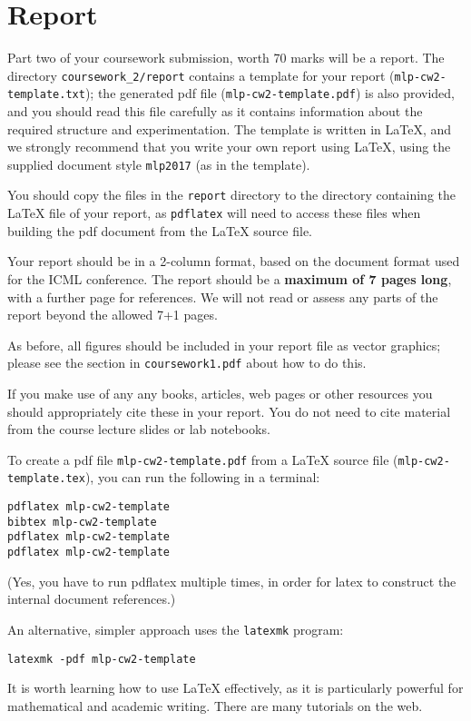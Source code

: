 \documentclass[11pt,]{article}
\begin{document}
\section{Report}
\label{sec:report}
Part two of your coursework submission, worth 70 marks will be a report. The directory
\verb+coursework_2/report+ contains a template for your report (\verb+mlp-cw2-template.txt+);  the generated pdf file (\verb+mlp-cw2-template.pdf+) is also provided, and you should read this file carefully as it contains information about the required structure and experimentation. The template is written in LaTeX, and we strongly recommend that you write your own report using LaTeX, using the supplied document style \verb+mlp2017+ (as in the template).

You should copy the files in the \verb+report+ directory to the directory containing the LaTeX file of your report, as \verb+pdflatex+ will need to access these files when building the pdf document from the LaTeX source file.

Your report should be in a 2-column format, based on the document format used for the ICML conference. The report should be a \textbf{maximum of 7 pages long}, with a further page for references.  We will not read or assess any parts of the report beyond the allowed 7+1 pages.  

As before, all figures should be included in your report file as vector graphics;
please see the section in \verb+coursework1.pdf+ about how to do this.

If you make use of any any books, articles, web pages or other resources
you should appropriately cite these in your report. You do not need to
cite material from the course lecture slides or lab notebooks.

To create a pdf file \verb+mlp-cw2-template.pdf+ from a LaTeX source file (\verb+mlp-cw2-template.tex+), you can run the following in a terminal:
\begin{verbatim}
pdflatex mlp-cw2-template
bibtex mlp-cw2-template
pdflatex mlp-cw2-template
pdflatex mlp-cw2-template
\end{verbatim}
(Yes, you have to run pdflatex multiple times, in order  for latex to construct the internal document references.)

An alternative, simpler approach uses the \verb+latexmk+ program:
\begin{verbatim}
latexmk -pdf mlp-cw2-template
\end{verbatim}

It is worth learning how to use LaTeX effectively, as it is particularly powerful for mathematical and academic writing.  There are many tutorials on the web.
\end{document}
